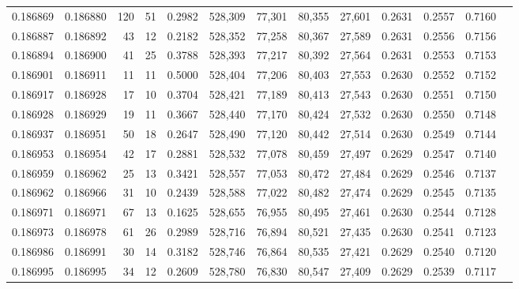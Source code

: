\begin{tabular}{rrrrrrrrrrrrr}
0.186869 & 0.186880 &   120 &  51 &                                     0.2982 & 528,309 &  77,301 &  80,355 &  27,601 & 0.2631 & 0.2557 & 0.7160 \\
0.186887 & 0.186892 &    43 &  12 &                                     0.2182 & 528,352 &  77,258 &  80,367 &  27,589 & 0.2631 & 0.2556 & 0.7156 \\
0.186894 & 0.186900 &    41 &  25 &                                     0.3788 & 528,393 &  77,217 &  80,392 &  27,564 & 0.2631 & 0.2553 & 0.7153 \\
0.186901 & 0.186911 &    11 &  11 &                                     0.5000 & 528,404 &  77,206 &  80,403 &  27,553 & 0.2630 & 0.2552 & 0.7152 \\
0.186917 & 0.186928 &    17 &  10 &                                     0.3704 & 528,421 &  77,189 &  80,413 &  27,543 & 0.2630 & 0.2551 & 0.7150 \\
0.186928 & 0.186929 &    19 &  11 &                                     0.3667 & 528,440 &  77,170 &  80,424 &  27,532 & 0.2630 & 0.2550 & 0.7148 \\
0.186937 & 0.186951 &    50 &  18 &                                     0.2647 & 528,490 &  77,120 &  80,442 &  27,514 & 0.2630 & 0.2549 & 0.7144 \\
0.186953 & 0.186954 &    42 &  17 &                                     0.2881 & 528,532 &  77,078 &  80,459 &  27,497 & 0.2629 & 0.2547 & 0.7140 \\
0.186959 & 0.186962 &    25 &  13 &                                     0.3421 & 528,557 &  77,053 &  80,472 &  27,484 & 0.2629 & 0.2546 & 0.7137 \\
0.186962 & 0.186966 &    31 &  10 &                                     0.2439 & 528,588 &  77,022 &  80,482 &  27,474 & 0.2629 & 0.2545 & 0.7135 \\
0.186971 & 0.186971 &    67 &  13 &                                     0.1625 & 528,655 &  76,955 &  80,495 &  27,461 & 0.2630 & 0.2544 & 0.7128 \\
0.186973 & 0.186978 &    61 &  26 &                                     0.2989 & 528,716 &  76,894 &  80,521 &  27,435 & 0.2630 & 0.2541 & 0.7123 \\
0.186986 & 0.186991 &    30 &  14 &                                     0.3182 & 528,746 &  76,864 &  80,535 &  27,421 & 0.2629 & 0.2540 & 0.7120 \\
0.186995 & 0.186995 &    34 &  12 &                                     0.2609 & 528,780 &  76,830 &  80,547 &  27,409 & 0.2629 & 0.2539 & 0.7117 \\

\end{tabular}
